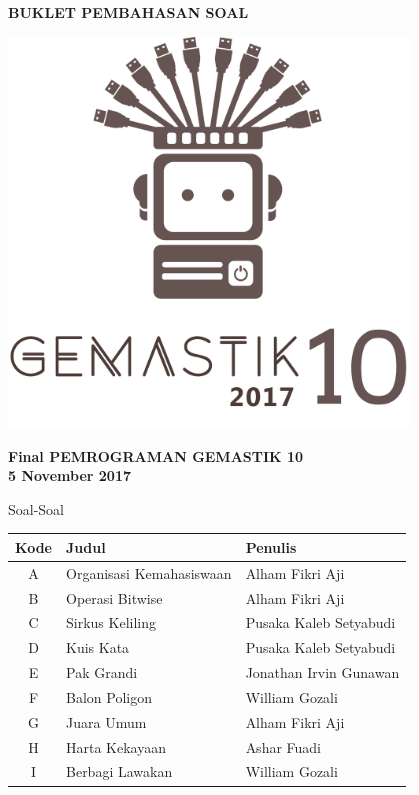 \documentclass[a4paper]{article}
\begin{document}
\begin{titlepage}
\begin{center}

    \textbf{\huge BUKLET PEMBAHASAN SOAL}
    
    \vspace{1cm} %

    \includegraphics[width=0.8\textwidth]{../gemastiklogo}
    
	\vspace{1cm} %
    
    \textbf{\LARGE Final PEMROGRAMAN GEMASTIK 10}\\[0.5cm]
    \textbf{\LARGE 5 November 2017}

	\vfill
	
	{\Large Soal-Soal}
	
	\def\arraystretch{1.5} %
	\begin{tabular}{|c|l|l|}
		\hline
		\textbf{Kode} & \textbf{Judul} & \textbf{Penulis} \\
		\hline
		A & Organisasi Kemahasiswaan & Alham Fikri Aji \\
		B & Operasi Bitwise & Alham Fikri Aji \\
		C & Sirkus Keliling & Pusaka Kaleb Setyabudi \\
		D & Kuis Kata & Pusaka Kaleb Setyabudi \\
		E & Pak Grandi & Jonathan Irvin Gunawan \\
		F & Balon Poligon & William Gozali \\
		G & Juara Umum & Alham Fikri Aji \\
		H & Harta Kekayaan & Ashar Fuadi \\
		I & Berbagi Lawakan & William Gozali \\
		\hline
	\end{tabular}

\end{center}
\end{titlepage}
\end{document}
